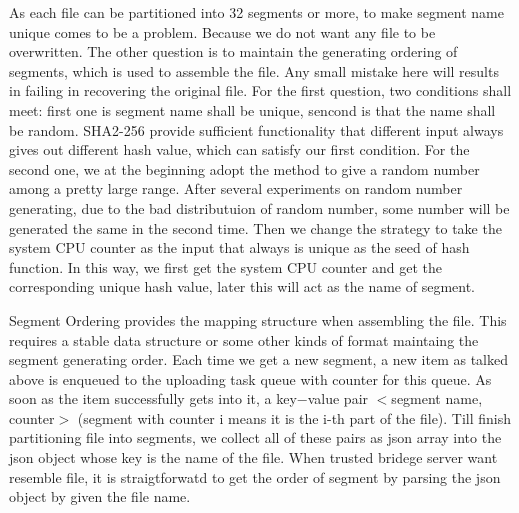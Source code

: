
As each file can be partitioned into 32 segments or more, to make segment name unique comes to be a problem. Because we do not want any file to be overwritten. 
The other question is to maintain the generating ordering of segments, which is used to assemble the file. Any small mistake here will results in failing in recovering the original file. For the first question, two conditions shall meet: first one is segment name shall be unique, sencond is that the name shall be random. SHA2-256 provide sufficient functionality that different input always gives out different hash value, which can satisfy our first condition. For the second one, we at the beginning adopt the method to give a random number among a pretty large range. After several experiments on random number generating, due to the bad distributuion of random number, some number will be generated the same in the second time. Then we change the strategy to take the system CPU counter as the input that always is unique as the seed of hash function. In this way, we first get the system CPU counter and get the corresponding unique hash value, later this will act as the name of segment.

Segment Ordering provides the mapping structure when assembling the file. This requires a stable data structure or some other kinds of format maintaing the segment generating order. Each time we get a new segment, a new item as talked above is enqueued to the uploading task queue with counter for this queue. As soon as the item successfully gets into it, a key$-$value pair $<$segment name, counter$>$ (segment with counter i means it is the i-th part of the file). Till finish partitioning file into segments, we collect all of these pairs as json array into the json object whose key is the name of the file. When trusted bridege server want resemble file, it is straigtforwatd to get the order of segment by parsing the json object by given the file name.
